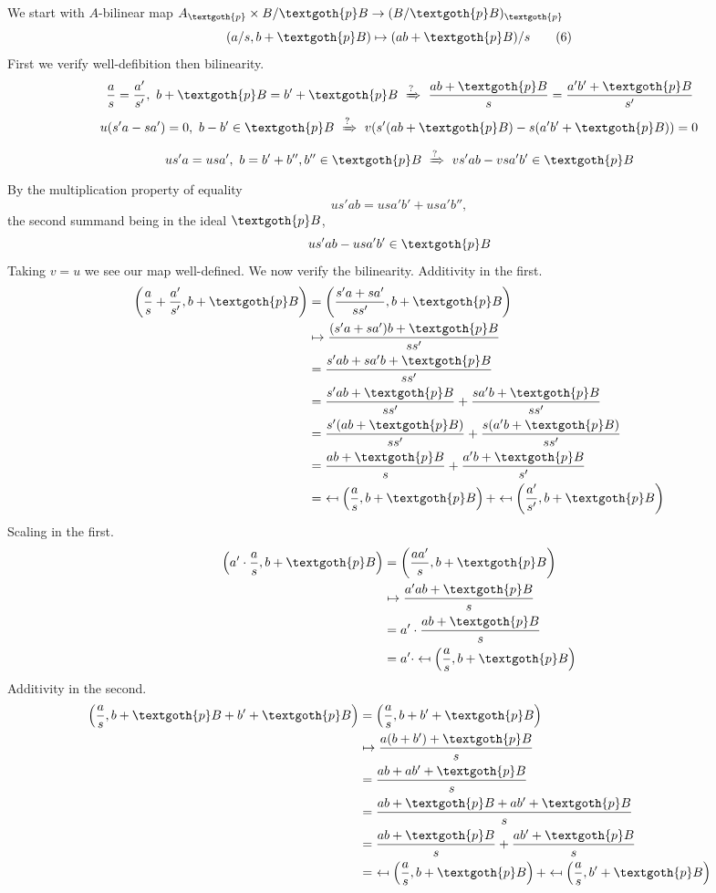 \documentclass{article}
\begin{document}
We start with $A$-bilinear map $A_\textgoth{p} \times B/\textgoth{p}B \rightarrow (B/\textgoth{p}B)_\textgoth{p}$
\[
(a/s, b + \textgoth{p}B) \mapsto (ab + \textgoth{p}B)/s
\tag{6}\label{eq:sixth}
\]
First we verify well-defibition then bilinearity.
\[
\frac{a}{s} = \frac{a'}{s'}, \ b + \textgoth{p}B = b' + \textgoth{p}B 
\ \xRightarrow{?} \ 
\frac{ab + \textgoth{p}B}{s} = \frac{a' b' + \textgoth{p}B}{s'}
\]
\[
u(s'a - sa') = 0, \ b - b' \in \textgoth{p}B
\ \xRightarrow{?} \ 
v(s'(ab + \textgoth{p}B) - s(a'b' + \textgoth{p}B)) = 0
\]
\[
us'a = usa', \ b = b' + b'', b'' \in \textgoth{p}B
\ \xRightarrow{?} \ 
vs'ab - vsa'b' \in \textgoth{p}B
\]
By the multiplication property of equality
\[
us'ab = usa'b' + usa'b'',
\]
the second summand being in the ideal $\textgoth{p}B$,
\[
us'ab - usa'b' \in \textgoth{p}B
\]
Taking $v = u$ we see our map well-defined. We now verify the bilinearity. Additivity in the first.
\begin{align*}
\left( \frac{a}{s} + \frac{a'}{s'}, b + \textgoth{p}B \right) 
& = \left( \frac{s'a + sa'}{ss'}, b + \textgoth{p}B \right) \\
& \mapsto \frac{(s'a + sa')b + \textgoth{p}B}{ss'} \\
& = \frac{s'ab + sa'b + \textgoth{p}B}{ss'} \\
& = \frac{s'ab + \textgoth{p}B}{ss'} + \frac{sa'b + \textgoth{p}B}{ss'} \\
& = \frac{s'(ab + \textgoth{p}B)}{ss'} + \frac{s(a'b + \textgoth{p}B)}{ss'} \\
& = \frac{ab + \textgoth{p}B}{s} + \frac{a'b + \textgoth{p}B}{s'} \\
& = \ \mapsfrom \left( \frac{a}{s}, b + \textgoth{p}B \right) + \mapsfrom \left( \frac{a'}{s'}, b + \textgoth{p}B \right)
\end{align*}
Scaling in the first.
\begin{align*}
\left( a' \cdot \frac{a}{s}, b + \textgoth{p}B \right) 
& = \left( \frac{aa'}{s}, b + \textgoth{p}B \right) \\
& \mapsto \frac{a'ab + \textgoth{p}B}{s} \\
& = a' \cdot \frac{ab + \textgoth{p}B}{s} \\
& = a' \cdot \mapsfrom \left( \frac{a}{s}, b + \textgoth{p}B \right)
\end{align*}
Additivity in the second.
\begin{align*}
\left( \frac{a}{s}, b + \textgoth{p}B + b' + \textgoth{p}B \right)
& = \left( \frac{a}{s}, b + b' + \textgoth{p}B \right) \\
& \mapsto \frac{a(b + b') + \textgoth{p}B}{s} \\
& = \frac{ab + ab' + \textgoth{p}B}{s} \\
& = \frac{ab + \textgoth{p}B + ab' + \textgoth{p}B}{s} \\
& = \frac{ab  + \textgoth{p}B}{s} + \frac{ab' + \textgoth{p}B}{s} \\
& = \ \mapsfrom \left( \frac{a}{s}, b + \textgoth{p}B \right) + \mapsfrom \left( \frac{a}{s}, b' + \textgoth{p}B \right)
\end{align*}
\end{document}
